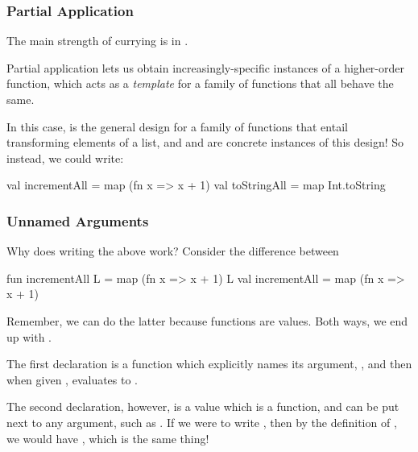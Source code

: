 \documentclass[aspectratio=169, handout]{beamer}
\begin{document}
\begin{frame}[fragile]
  \frametitle{Partial Application}

  The main strength of currying is in .

  \pause
  \vspace{\fill}


  \pause
  \vspace{\fill}

  Partial application lets us obtain increasingly-specific instances of a higher-order
  function, which acts as a \textit{template} for a family of functions that all behave
  the same.

  \pause
  \vspace{\fill}

  In this case,  is the general design for a family of functions that entail
  transforming elements of a list, and  and  are
  concrete instances of this design! So instead, we could write: 

  \pause
  \begin{codeblock}
    val incrementAll = map (fn x => x + 1)
    val toStringAll = map Int.toString 
  \end{codeblock}
\end{frame}

\begin{frame}[fragile]
  \frametitle{Unnamed Arguments}

  Why does writing the above work? Consider the difference between
  \begin{codeblock}
    fun incrementAll L = map (fn x => x + 1) L
    val incrementAll = map (fn x => x + 1)
  \end{codeblock}

  \pause
  \vspace{\fill}

  Remember, we can do the latter because functions are values. Both ways,
  we end up with .

  \pause
  \vspace{\fill}

  The first declaration is a function which explicitly names its argument,
  , and then when given , evaluates to .

  \pause
  \vspace{\fill}

  The second declaration, however, is a value which is a function, and can 
  be put next to any argument, such as . If we were to write
  , then by the definition of ,
  we would have , which is the same thing!
\end{frame}
\end{document}
